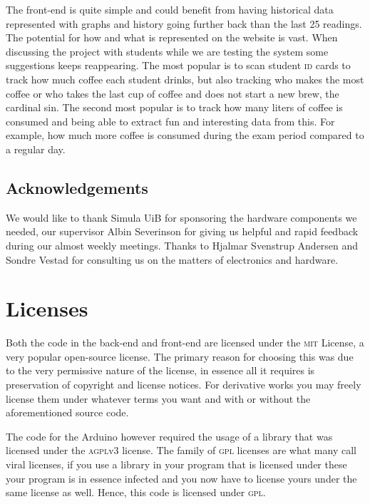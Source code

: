 \documentclass[12pt,a4paper,oneside,article]{memoir}
\numberwithin{equation}{chapter}
\begin{document}
The front-end is quite simple and could benefit from having historical data
represented with graphs and history going further back than the last 25
readings. The potential for how and what is represented on the website is vast.
When discussing the project with students while we are testing the system some
suggestions keeps reappearing. The most popular is to scan student \textsc{id}
cards to track how much coffee each student drinks, but also tracking who makes
the most coffee or who takes the last cup of coffee and does not start a new
brew, the cardinal sin. The second most popular is to track how many liters of
coffee is consumed and being able to extract fun and interesting data from this.
For example, how much more coffee is consumed during the exam period compared to
a regular day.

\section{Acknowledgements}\label{sec:acknowledgements}
We would like to thank Simula UiB for sponsoring the hardware components we
needed, our supervisor Albin Severinson for giving us helpful and rapid feedback
during our almost weekly meetings. Thanks to Hjalmar Svenstrup Andersen and
Sondre Vestad for consulting us on the matters of electronics and hardware.

\clearpage
\appendix
\chapter{Licenses}\label{sec:licenses}
Both the code in the back-end and front-end are licensed under the \textsc{mit}
License, a very popular open-source license. The primary reason for choosing
this was due to the very permissive nature of the license, in essence all it
requires is preservation of copyright and license notices. For derivative works
you may freely license them under whatever terms you want and with or without
the aforementioned source code.

The code for the Arduino however required the usage of a library that was
licensed under the \textsc{agpl}v3 license. The family of \textsc{gpl} licenses
are what many call viral licenses, if you use a library in your program that is
licensed under these your program is in essence infected and you now have to
license yours under the same license as well. Hence, this code is licensed under
\textsc{gpl}.
\end{document}
